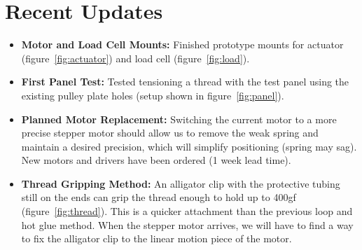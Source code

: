 \documentclass[letterpaper,12pt]{article}
\begin{document}
\section*{Recent Updates}
\begin{itemize}
\item{\textbf{Motor and Load Cell Mounts:} Finished prototype mounts for actuator (figure~\ref{fig:actuator}) and load cell (figure~\ref{fig:load}).}
\item{\textbf{First Panel Test:} Tested tensioning a thread with the test panel using the existing pulley plate holes (setup shown in figure~\ref{fig:panel}).
}
\item{\textbf{Planned Motor Replacement:} Switching the current motor to a more precise stepper motor should allow us to remove the weak spring and maintain a desired precision, which will simplify positioning (spring may sag). New motors and drivers have been ordered (1 week lead time).
}
\item{\textbf{Thread Gripping Method:} An alligator clip with the protective tubing still on the ends can grip the thread enough to hold up to 400gf (figure~\ref{fig:thread}). This is a quicker attachment than the previous loop and hot glue method. When the stepper motor arrives, we will have to find a way to fix the alligator clip to the linear motion piece of the motor.
}
\end{itemize}
\end{document}
